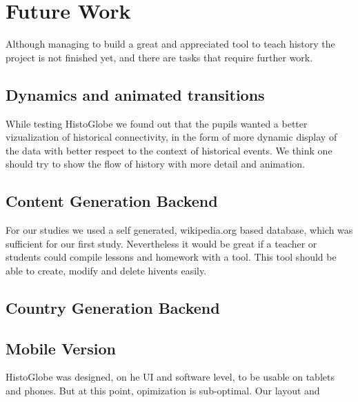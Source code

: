 \section{Future Work}
Although managing to build a great and appreciated tool to teach history the project is not finished yet, and there are tasks that require further work.

\subsection{Dynamics and animated transitions} %
\label{sub:dynamics_and_animated_transitions}
While testing HistoGlobe we found out that the pupils wanted a better vizualization of historical connectivity, in the form of  more dynamic display of the data with better respect to the context of historical events. We think one should try to show the flow of history with more detail and animation. 




\subsection{Content Generation Backend} %
\label{sub:content_generation_backend}

For our studies we used a self generated, wikipedia.org based database, which was sufficient for our first study. Nevertheless it would be great if a teacher or students could compile lessons and homework with a tool. This tool should be able to create, modify and delete hivents easily. 


\subsection{Country Generation Backend} %
\label{sub:country_generation_backend}


\subsection{Mobile Version} %
\label{sub:mobile_version}
HistoGlobe was designed, on he UI and software level, to be usable on tablets and phones. But at this point, opimization is sub-optimal. Our layout and 


